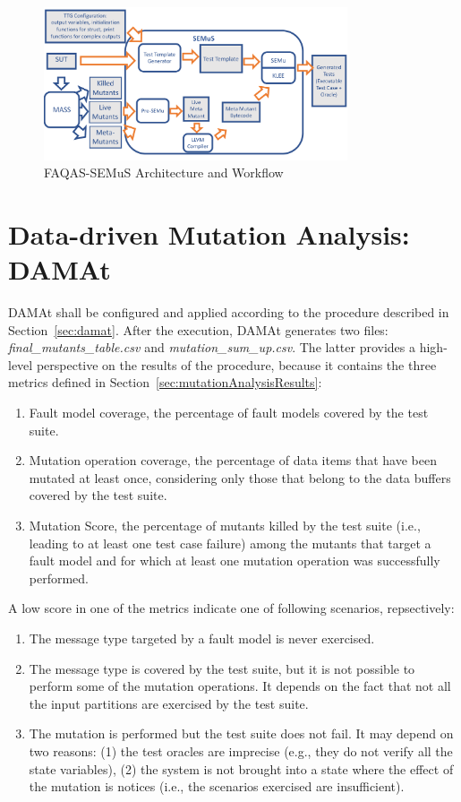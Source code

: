 \begin{figure}[h]
\begin{center}
\includegraphics[width=0.8\textwidth]{images/semus-architecture2}
\caption{FAQAS-SEMuS Architecture and Workflow}
\label{fig:semus_architecture_meth}
\end{center}
\end{figure}

\clearpage
\section{Data-driven Mutation Analysis: DAMAt}
\label{sec:meth:damat}

DAMAt shall be configured and applied according to the procedure described in Section~\ref{sec:damat}.
After the execution, DAMAt generates two files: \emph{final\_mutants\_table.csv} and \emph{mutation\_sum\_up.csv}.
The latter provides a high-level perspective on the results of the procedure, because it contains the three metrics defined in Section~\ref{sec:mutationAnalysisResults}:
\begin{enumerate}
\item Fault model coverage, the percentage of fault models covered by the test suite.
\item Mutation operation coverage, the percentage of data items that have been mutated at least once, considering only those that belong to the data buffers covered by the test suite.
\item Mutation Score, the percentage of mutants killed by the test suite (i.e., leading to at least one test case failure) among the mutants that target a fault model and for which at least one mutation operation was successfully performed.
\end{enumerate}


A low score in one of the metrics indicate one of following scenarios, repsectively:
\begin{enumerate}
\item The message type targeted by a fault model is never exercised.
\item The message type is covered by the test suite, but it is not possible to perform some of the mutation operations. It depends on the fact that not all the input partitions are exercised by the test suite.
\item The mutation is performed but the test suite does not fail. It may depend on two reasons: (1) the test oracles are imprecise (e.g., they do not verify all the state variables), (2) the system is not brought into a state where the effect of the mutation is notices (i.e., the scenarios exercised are insufficient).
\end{enumerate}


